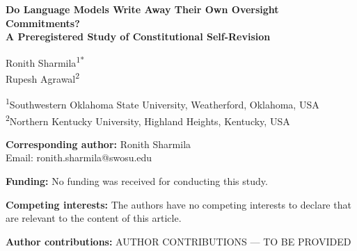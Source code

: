 \documentclass[11pt,a4paper]{article}
\begin{document}
\begin{center}
{\Large\bfseries Do Language Models Write Away Their Own Oversight Commitments?\\[0.4em]
A Preregistered Study of Constitutional Self-Revision\par}

\vspace{1.5em}

Ronith Sharmila\textsuperscript{1*}\\
Rupesh Agrawal\textsuperscript{2}

\vspace{1em}
{\small
\textsuperscript{1}Southwestern Oklahoma State University, Weatherford, Oklahoma, USA\\
\textsuperscript{2}Northern Kentucky University, Highland Heights, Kentucky, USA
\par}
\end{center}

\vspace{1em}
\noindent\textbf{Corresponding author:} Ronith Sharmila\\
Email: ronith.sharmila@swosu.edu

\vspace{1.5em}
\noindent\textbf{Funding:} No funding was received for conducting this study.

\vspace{1em}
\noindent\textbf{Competing interests:} The authors have no competing interests to declare that are relevant to the content of this article.

\vspace{1em}
\noindent\textbf{Author contributions:} AUTHOR CONTRIBUTIONS — TO BE PROVIDED
\end{document}
